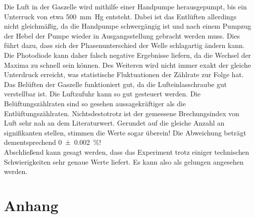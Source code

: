 \noindent Die Luft in der Gaszelle wird mithilfe einer Handpumpe herausgepumpt, bis ein Unterruck von etwa 
\qty{500}{\milli \meter Hg} entsteht. Dabei ist das Entlüften allerdings nicht gleichmäßig, da die Handpumpe 
schwergängig ist und nach einem Pumpzug der Hebel der Pumpe wieder in Ausgangsstellung gebracht werden muss. 
Dies führt dazu, dass sich der Phasenunterschied der Welle schlagartig ändern kann. Die Photodiode kann daher 
falsch negative Ergebnisse liefern, da die Wechsel der Maxima zu schnell sein können. 
Des Weiteren wird nicht immer exakt der gleiche Unterdruck erreicht, was statistische Fluktuationen der Zählrate 
zur Folge hat. Das Belüften der Gaszelle funktioniert gut, da die Lufteinlasschraube gut verstellbar ist. Die 
Luftzufuhr kann so gut gesteuert werden. Die Belüftungszählraten sind so gesehen aussagekräftiger als die 
Entlüftungszählraten.
Nichtsdestotrotz ist der gemessene Brechungsindex von Luft sehr nah an dem Literaturwert. Gerundet auf die gleiche 
Anzahl an signifikanten stellen, stimmen die Werte sogar überein! Die Abweichung beträgt dementsprechend 
\qty{0\pm0.002}{\percent}!\\

\noindent Abschließend kann gesagt werden, dass das Experiment trotz einiger technischen Schwierigkeiten sehr genaue 
Werte liefert. Es kann also als gelungen angesehen werden.




\section{Anhang}

